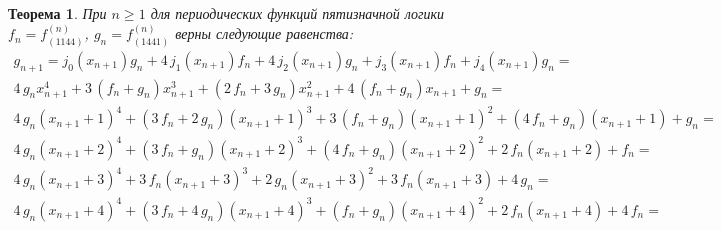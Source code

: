 \documentclass[a4paper, 12pt]{article}
\newtheorem{myth}{Теорема}
\begin{document}
\begin{myth} При $n \geqslant 1 $ для периодических функций пятизначной логики $f_n = f^{\left(n\right)}_{\left(1144\right)}$,
$g_n = f^{\left(n\right)}_{\left(1441\right)}$ верны следующие равенства:
$$\begin{array}{l}
 g_{n+1} = j_0(x_{n+1})g_n + 4\,j_1(x_{n+1})f_n + 4\,j_2(x_{n+1})g_n + j_3(x_{n+1})f_n + j_4(x_{n+1})g_n=\\
4 \, g_{n} x_{n+1}^{4} + 3 \, {\left(f_{n} + g_{n}\right)} x_{n+1}^{3} + {\left(2 \, f_{n} + 3 \, g_{n}\right)} x_{n+1}^{2} + 4 \, {\left(f_{n} + g_{n}\right)} x_{n+1} + g_{n}=\\
4 \, g_{n} {\left(x_{n+1} + 1\right)}^{4} + {\left(3 \, f_{n} + 2 \, g_{n}\right)} {\left(x_{n+1} + 1\right)}^{3} + 3 \, {\left(f_{n} + g_{n}\right)} {\left(x_{n+1} + 1\right)}^{2} + {\left(4 \, f_{n} + g_{n}\right)} {\left(x_{n+1} + 1\right)} + g_{n}=\\
4 \, g_{n} {\left(x_{n+1} + 2\right)}^{4} + {\left(3 \, f_{n} + g_{n}\right)} {\left(x_{n+1} + 2\right)}^{3} + {\left(4 \, f_{n} + g_{n}\right)} {\left(x_{n+1} + 2\right)}^{2} + 2 \, f_{n} {\left(x_{n+1} + 2\right)} + f_{n}=\\
4 \, g_{n} {\left(x_{n+1} + 3\right)}^{4} + 3 \, f_{n} {\left(x_{n+1} + 3\right)}^{3} + 2 \, g_{n} {\left(x_{n+1} + 3\right)}^{2} + 3 \, f_{n} {\left(x_{n+1} + 3\right)} + 4 \, g_{n}=\\
4 \, g_{n} {\left(x_{n+1} + 4\right)}^{4} + {\left(3 \, f_{n} + 4 \, g_{n}\right)} {\left(x_{n+1} + 4\right)}^{3} + {\left(f_{n} + g_{n}\right)} {\left(x_{n+1} + 4\right)}^{2} + 2 \, f_{n} {\left(x_{n+1} + 4\right)} + 4 \, f_{n}=\\
\end{array}$$
\end{myth}
\end{document}
